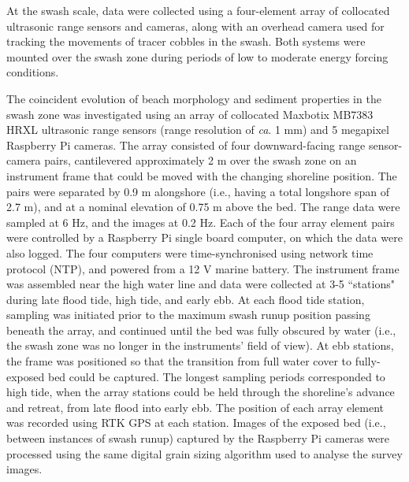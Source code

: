 At the swash scale, data were collected using a four-element array of collocated ultrasonic range sensors and cameras, along with an overhead camera used for tracking the movements of tracer cobbles in the swash. Both systems were mounted over the swash zone during periods of low to moderate energy forcing conditions.

The coincident evolution of beach morphology and sediment properties in the swash zone was investigated using an array of collocated Maxbotix MB7383 HRXL ultrasonic range sensors (range resolution of \textit{ca}. 1 mm) and 5 megapixel Raspberry Pi cameras. The array consisted of four downward-facing range sensor-camera pairs, cantilevered approximately 2 m over the swash zone on an instrument frame that could be moved with the changing shoreline position. The pairs were separated by 0.9 m alongshore (i.e., having a total longshore span of 2.7 m), and at a nominal elevation of 0.75 m above the bed. The range data were sampled at 6 Hz, and the images at 0.2 Hz. Each of the four array element pairs were controlled by a Raspberry Pi single board computer, on which the data were also logged. The four computers were time-synchronised using network time protocol (NTP), and powered from a 12 V marine battery. The instrument frame was assembled near the high water line and data were collected at 3-5 ``stations" during late flood tide, high tide, and early ebb. At each flood tide station, sampling was initiated prior to the maximum swash runup position passing beneath the array, and continued until the bed was fully obscured by water (i.e., the swash zone was no longer in the instruments' field of view). At ebb stations, the frame was positioned so that the transition from full water cover to fully-exposed bed could be captured. The longest sampling periods corresponded to high tide, when the array stations could be held through the shoreline's advance and retreat, from late flood into early ebb. The position of each array element was recorded using RTK GPS at each station. Images of the exposed bed (i.e., between instances of swash runup) captured by the Raspberry Pi cameras were processed using the same digital grain sizing algorithm used to analyse the survey images.

